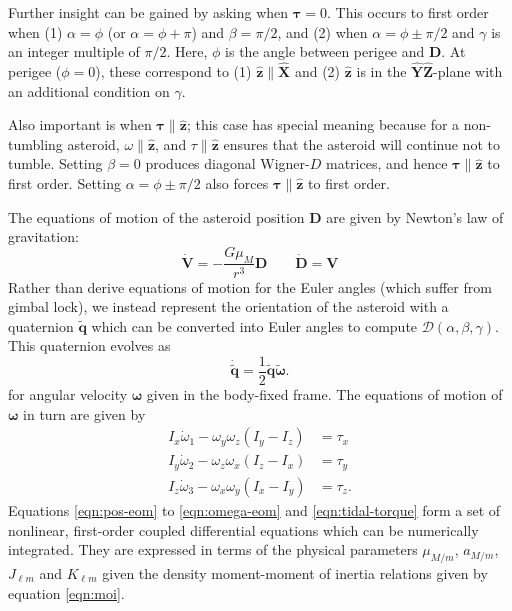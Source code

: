 \documentclass[fleqn,usenatbib]{mnras}
\newcommand{\unit}[1]{\bm{\hat{#1}}}
\newcommand{\quat}[1]{\widetilde{\bm{#1}}}
\begin{document}
Further insight can be gained by asking when $\bm \tau = 0$. This occurs to first order when (1) $\alpha=\phi$ (or  $\alpha=\phi+\pi$) and $\beta =\pi/2$, and (2) when $\alpha=\phi\pm\pi/2$ and $\gamma$ is an integer multiple of $\pi/2$. Here, $\phi$ is the angle between perigee and $\bm D$. At perigee ($\phi=0$), these correspond to (1) $\unit z \parallel \unit X$ and (2) $\unit z$ is in the $\unit{Y}\unit{Z}$-plane with an additional condition on $\gamma$.

Also important is when $\bm \tau \parallel \unit z$; this case has special meaning because for a non-tumbling asteroid, $\omega \parallel \unit z$, and $\tau \parallel \unit z$ ensures that the asteroid will continue not to tumble. Setting $\beta = 0$ produces diagonal Wigner-$D$ matrices, and hence $\bm \tau \parallel \unit z$ to first order. Setting $\alpha = \phi \pm \pi/2$ also forces $\bm \tau \parallel \unit z$ to first order.

The equations of motion of the asteroid position $\bm D$ are given by Newton's law of gravitation:
\begin{equation}
  \dot{\bm V} = -\frac{G \mu_M}{r^3} \bm D \qquad \dot{\bm D} = \bm V
  \label{eqn:pos-eom}
\end{equation}
Rather than derive equations of motion for the Euler angles (which suffer from gimbal lock), we instead represent the orientation of the asteroid with a quaternion $\quat q$ which can be converted into Euler angles to compute $\mathcal{D}(\alpha, \beta, \gamma)$. This quaternion evolves as 
\begin{equation}
  \dot{\quat q} = \frac{1}{2}\quat q\quat \omega.
  \label{eqn:quat-eom}
\end{equation}
for angular velocity $\bm \omega$ given in the body-fixed frame. The equations of motion of $\bm \omega$ in turn are given by
\begin{equation}
  \begin{split}
    I_x \dot \omega_1 - \omega_y \omega_z (I_y - I_z) &= \tau_x\\
    I_y \dot \omega_2 - \omega_z \omega_x (I_z - I_x) &= \tau_y\\
    I_z \dot \omega_3 - \omega_x \omega_y (I_x - I_y) &= \tau_z.
  \end{split}
  \label{eqn:omega-eom}
\end{equation}
Equations \ref{eqn:pos-eom} to \ref{eqn:omega-eom} and \ref{eqn:tidal-torque} form a set of nonlinear, first-order coupled differential equations which can be numerically integrated. They are expressed in terms of the physical parameters $\mu_{M/m}$, $a_{M/m}$, $J_{\ell m}$ and $K_{\ell m}$ given the density moment-moment of inertia relations given by equation \ref{eqn:moi}.
\end{document}
